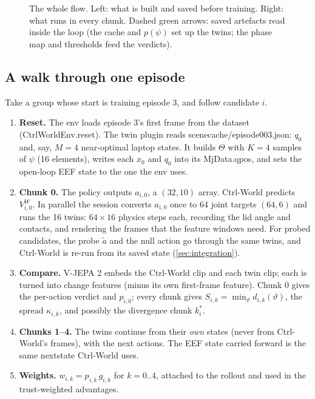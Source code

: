\documentclass[11pt,a4paper]{article}
\newcommand{\code}[1]{{\small\ttfamily\begingroup\def\_{\textunderscore\allowbreak}\def\/{/\allowbreak}#1\endgroup}}
\newcommand{\VW}{V^{W}}
\begin{document}
\begin{figure}[h]
\caption{The whole flow. Left: what is built and saved before training. Right: what runs in every chunk. Dashed green arrows: saved artefacts read inside the loop (the cache and $p(\psi)$ set up the twins; the phase map and thresholds feed the verdicts).}
\label{fig:flow}
\end{figure}

\subsection{A walk through one episode}
Take a group whose start is training episode 3, and follow candidate $i$.
\begin{enumerate}
\item \textbf{Reset.} The env loads episode 3's first frame from the dataset (\code{CtrlWorldEnv.reset}). The twin plugin reads \code{scene\_cache\/episode\_003.json}: $q_0$ and, say, $M=4$ near-optimal laptop states. It builds $\Theta$ with $K=4$ samples of $\psi$ (16 elements), writes each $x_0$ and $q_0$ into its \code{MjData.qpos}, and sets the open-loop EEF state to the one the env uses.
\item \textbf{Chunk 0.} The policy outputs $a_{i,0}$, a $(32,10)$ array. Ctrl-World predicts $\VW_{i,0}$. In parallel the session converts $a_{i,0}$ once to 64 joint targets $(64,6)$ and runs the 16 twins: $64\times16$ physics steps each, recording the lid angle and contacts, and rendering the frames that the feature windows need. For probed candidates, the probe $\tilde a$ and the null action go through the same twins, and Ctrl-World is re-run from its saved state (\cref{sec:integration}).
\item \textbf{Compare.} V-JEPA 2 embeds the Ctrl-World clip and each twin clip; each is turned into change features (minus its own first-frame feature). Chunk 0 gives the per-action verdict and $p_{i,0}$; every chunk gives $S_{i,k}=\min_\vartheta d_{i,k}(\vartheta)$, the spread $\kappa_{i,k}$, and possibly the divergence chunk $k^\ast_i$.
\item \textbf{Chunks 1--4.} The twins continue from their \emph{own} states (never from Ctrl-World's frames), with the next actions. The EEF state carried forward is the same \code{next\_state} Ctrl-World uses.
\item \textbf{Weights.} $w_{i,k}=p_{i,k}\,g_{i,k}$ for $k=0..4$, attached to the rollout and used in the trust-weighted advantages.
\end{enumerate}
\end{document}
